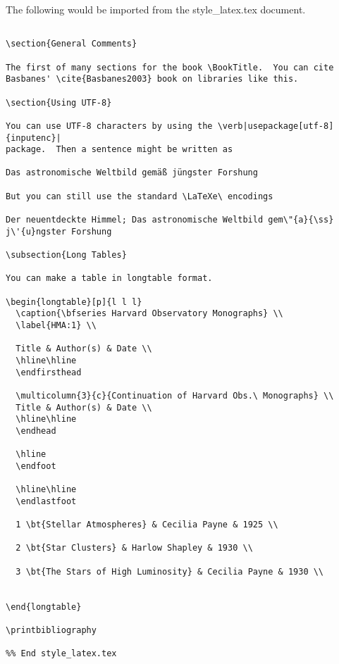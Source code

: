  The following would be imported from  the style\_latex.tex document.

\begin{verbatim}

\section{General Comments}

The first of many sections for the book \BookTitle.  You can cite 
Basbanes' \cite{Basbanes2003} book on libraries like this.

\section{Using UTF-8}

You can use UTF-8 characters by using the \verb|usepackage[utf-8]{inputenc}|
package.  Then a sentence might be written as

Das astronomische Weltbild gemäß jüngster Forshung

But you can still use the standard \LaTeXe\ encodings

Der neuentdeckte Himmel; Das astronomische Weltbild gem\"{a}{\ss} j\'{u}ngster Forshung

\subsection{Long Tables}

You can make a table in longtable format.

\begin{longtable}[p]{l l l}
  \caption{\bfseries Harvard Observatory Monographs} \\
  \label{HMA:1} \\

  Title & Author(s) & Date \\
  \hline\hline
  \endfirsthead

  \multicolumn{3}{c}{Continuation of Harvard Obs.\ Monographs} \\
  Title & Author(s) & Date \\
  \hline\hline
  \endhead

  \hline
  \endfoot
  
  \hline\hline
  \endlastfoot

  1 \bt{Stellar Atmospheres} & Cecilia Payne & 1925 \\

  2 \bt{Star Clusters} & Harlow Shapley & 1930 \\

  3 \bt{The Stars of High Luminosity} & Cecilia Payne & 1930 \\

  
\end{longtable}

\printbibliography

%% End style_latex.tex
\end{verbatim}

